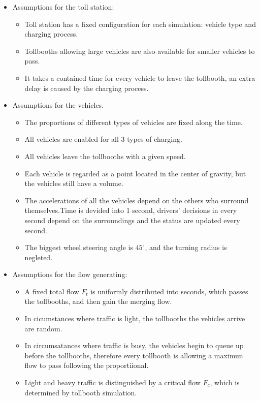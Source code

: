 \documentclass{mcmthesis}
\begin{document}
\begin{itemize}
	\item Assumptions for the toll station:
	\begin{itemize}
         \item Toll station has a fixed configuration for each simulation: vehicle type and charging process.
         \item Tollbooths allowing large vehicles are also available for smaller vehicles to pass.
       	 \item It takes a contained time for every vehicle to leave the tollbooth, an extra delay is caused by the charging process.
	\end{itemize}

    \item Assumptions for the vehicles.
    \begin{itemize}
    	\item The proportions of different types of vehicles are fixed along the time.
    	\item All vehicles are enabled for all 3 types of charging.
    	\item All vehicles leave the tollbooths with a given speed.
    	\item Each vehicle is regarded as a point located in the center of gravity, but the vehicles still have a volume.
    	\item The accelerations of all the vehicles depend on the others who surround themselves.Time is devided into 1 second, drivers' decisions in every second depend on the surroundings and the status are updated every second.
    	\item The biggest wheel steering angle is $45^{\circ}$, and the turning radius is negleted.
    	
    \end{itemize}
    \item Assumptions for the flow generating:
    \begin{itemize}
    \item A fixed total flow $F_t$ is uniformly distributed into seconds, which passes the tollbooths, and then gain the merging flow.
   	\item In cicumstances where traffic is light, the tollbooths the vehicles arrive are random.
    \item In circumsatances where traffic is busy, the vehicles begin to queue up before the tollbooths, therefore every tollbooth is allowing a maximun flow to pass following the proportiional.
    \item Light and heavy traffic is distinguished by a critical flow  $F_c$, which is determined by tollbooth simulation.
    \end{itemize}
	
	
\end{itemize}
\end{document}
